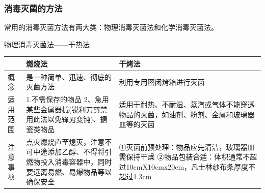 \documentclass[11pt, a4paper]{ctexart}
\begin{document}
\subsubsection{消毒灭菌的方法}
常用的消毒灭菌方法有两大类：物理消毒灭菌法和化学消毒灭菌法。

\begin{tipsbox}{物理消毒灭菌法——干热法}
	\begin{tabular}{|p{3cm}|p{5cm}|p{5cm}|}
		\hline
		     & \textbf{燃烧法}                                         & \textbf{干烤法}                                                            \\
		\hline
		概念   & 是一种简单、迅速、彻底的灭菌方法                                     & 利用专用密闭烤箱进行灭菌                                                            \\
		\hline
		适用范围 & 1.不需保存的物品 2、急用某些金属器械(锐利刀剪禁用此法以免锋刃变钝)、搪瓷类物品           & 适用于耐热、不耐湿、蒸汽或气体不能穿透物品的灭菌，如油剂、粉剂、金属和玻璃器皿等的灭菌                             \\
		\hline
		注意事项 & 点火燃烧直至熄灭，注意不可中途添加乙醇、不得将引燃物投入消毒容器中，同时要远离易燃、易爆物品等以确保安全 & ①灭菌前预处理：物品应先清洁，玻璃器皿需保持干燥 ②物品包装合适：体积通常不超过10cmX10cmx20cm，凡士林纱布条厚度不超过1.3cm \\
		\hline
	\end{tabular}
\end{tipsbox}
\end{document}
